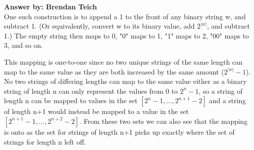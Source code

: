 \documentclass[12pt]{article}
\begin{document}
\begin{enumerate}
{\bf Answer by: Brendan Teich} \\
One such construction is to append a 1 to the front of any binary string w, and subtract 1.  (Or equivalently, convert w to its binary value, add $2^{|w|}$, and subtract 1.)  The empty string then maps to 0, "0" maps to 1, "1" maps to 2, "00" maps to 3, and so on.

This mapping is one-to-one since no two unique strings of the same length can map to the same value as they are both increased by the same amount ($2^{|w|} - 1$).  No two strings of differing lengths can map to the same value either as a binary string of length n can only represent the values from 0 to $2^n -1$, so a string of length n can be mapped to values in the set $[2^n - 1, ..., 2^{n+1}-2]$ and a string of length n+1 would instead be mapped to a value in the set $[2^{n+1} - 1, ..., 2^{n+2}-2]$. From these two sets we can also see that the mapping is onto as the set for strings of length n+1 picks up exactly where the set of strings for length n left off.

\end{enumerate}
\end{document}
